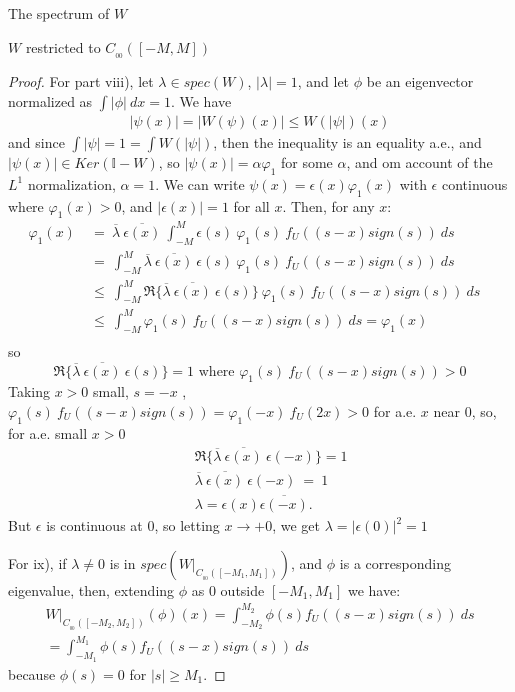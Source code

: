 \documentclass[12pt]{article}
\begin{document}
\begin{section}{The spectrum of $W$ }
\begin{subsection}{$W$ restricted to $C_{_{0\!0}}([-M,M])$}
\begin{proof}
For part viii), let $\lambda \in spec(W)$, $|\lambda|=1$, and let $\phi$ be an eigenvector normalized as $\int |\phi| \ dx = 1$. We have
\begin{align*}
|\psi(x)| = \left|W(\psi)(x)\right| \le W(|\psi|)(x) 
\end{align*}
and since $\int |\psi| = 1 = \int W(|\psi|)$, then the inequality is an equality a.e., and $|\psi(x)| \in Ker(\mathbb{I}-W)$, so $|\psi(x)| = \alpha \varphi_1$ for some $\alpha$, and om account of the $L^1$ normalization, $\alpha=1$. We can write  $\psi(x) = \epsilon(x) \varphi_1(x)$ with $\epsilon$ continuous where $\varphi_1(x)>0$, and $|\epsilon(x)| = 1$ for all $x$. Then, for any $x$:
\begin{align*}
\varphi_1(x) &~=~ \overline{\lambda} \ \overline{\epsilon(x)} \ 
\int_{-M}^{M}  \epsilon(s) \ \varphi_1(s) \ f_U\!( (s-x)sign(s) )\ ds &\\
&~=~ 
\int_{-M}^{M}  \overline{\lambda} \ \overline{\epsilon(x)} \ \epsilon(s) \ \varphi_1(s) \ f_U\!( (s-x)sign(s) )\ ds  &\\
 &~\le~ \int_{-M}^{M}  \Re{\Big\{\overline{\lambda} \ \overline{\epsilon(x)} \ \epsilon(s) \Big\} } \ \varphi_1(s) \ f_U\!( (s-x)sign(s) )\ ds  &\\
 &~\le~ \int_{-M}^{M}  \varphi_1(s) \ f_U\!( (s-x)sign(s) )\ ds =  \varphi_1(x) &\\
\end{align*}
so 
$$
\Re{\Big\{\overline{\lambda} \ \overline{\epsilon(x)} \ \epsilon(s) \Big\} } = 1 \text{ where } \varphi_1(s) \ f_U\!( (s-x)sign(s) ) > 0
$$
Taking $x > 0$ small, $s = -x$ , $ \varphi_1(s) \ f_U\!( (s-x)sign(s) ) = \varphi_1(-x) \ f_U\!( 2x ) > 0 $ for a.e. $x$ near $0$, so, for a.e. small $x>0$
\begin{align*}
&& &\Re{\Big\{\overline{\lambda} \ \overline{\epsilon(x)} \ \epsilon(-x) \Big\} } = 1 &\\
&& &\overline{\lambda} \ \overline{\epsilon(x)} \ \epsilon(-x)  ~=~ 1 &\\
&& &\lambda = \epsilon(x) \overline{\epsilon(-x)}. &
\end{align*}
But $\epsilon$ is continuous at $0$, so letting $x \rightarrow +0$, we get  $\lambda = |\epsilon(0)|^2 = 1$

For ix), if $\lambda \ne 0$ is in $spec(W\Big|_{C_{_{00}}([-M_1,M_1])})$, and $\phi$ is a corresponding eigenvalue, then, extending  $\phi$ as $0$ outside $[-M_1,M_1]$ we have:
\begin{align*}
W\Big|_{C_{_{00}}([-M_2,M_2])}(\phi)(x) = \int_{-M_2}^{M_2} \phi(s) f_U\!( (s-x)sign(s)) \ ds \\
= \int_{-M_1}^{M_1} \phi(s) f_U\!( (s-x)sign(s)) \ ds
\end{align*}
because $\phi(s) = 0$ for $|s| \ge M_1$. 


\end{proof}
\end{subsection}
\end{section}
\end{document}
